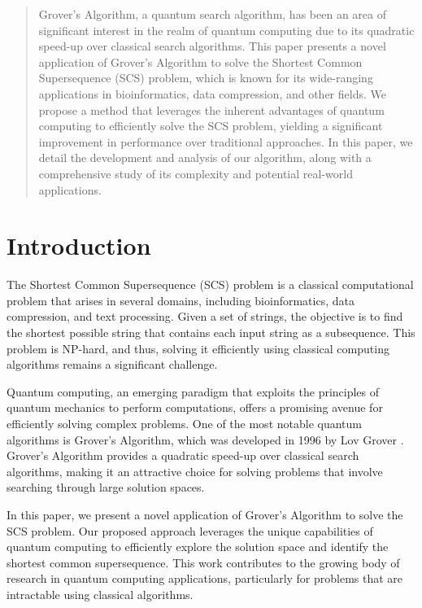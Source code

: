 \begin{abstract}
Grover's Algorithm, a quantum search algorithm, has been an area of significant interest in the realm of quantum computing due to its quadratic speed-up over classical search algorithms. This paper presents a novel application of Grover's Algorithm to solve the Shortest Common Supersequence (SCS) problem, which is known for its wide-ranging applications in bioinformatics, data compression, and other fields. We propose a method that leverages the inherent advantages of quantum computing to efficiently solve the SCS problem, yielding a significant improvement in performance over traditional approaches. In this paper, we detail the development and analysis of our algorithm, along with a comprehensive study of its complexity and potential real-world applications.

\end{abstract}

\section{Introduction}

The Shortest Common Supersequence (SCS) problem is a classical computational problem that arises in several domains, including bioinformatics, data compression, and text processing. Given a set of strings, the objective is to find the shortest possible string that contains each input string as a subsequence. This problem is NP-hard, and thus, solving it efficiently using classical computing algorithms remains a significant challenge.

Quantum computing, an emerging paradigm that exploits the principles of quantum mechanics to perform computations, offers a promising avenue for efficiently solving complex problems. One of the most notable quantum algorithms is Grover's Algorithm, which was developed in 1996 by Lov Grover \cite{grover1996fast}. Grover's Algorithm provides a quadratic speed-up over classical search algorithms, making it an attractive choice for solving problems that involve searching through large solution spaces.

In this paper, we present a novel application of Grover's Algorithm to solve the SCS problem. Our proposed approach leverages the unique capabilities of quantum computing to efficiently explore the solution space and identify the shortest common supersequence. This work contributes to the growing body of research in quantum computing applications, particularly for problems that are intractable using classical algorithms.

